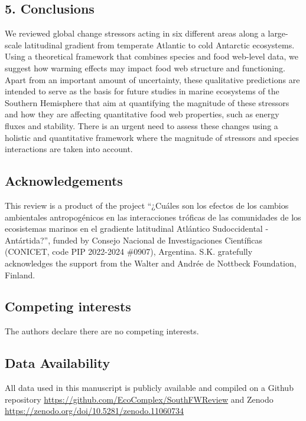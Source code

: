 \documentclass[
]{article}
\begin{document}
\subsection{5. Conclusions}\label{conclusions}

We reviewed global change stressors acting in six different areas along
a large-scale latitudinal gradient from temperate Atlantic to cold
Antarctic ecosystems. Using a theoretical framework that combines
species and food web-level data, we suggest how warming effects may
impact food web structure and functioning. Apart from an important
amount of uncertainty, these qualitative predictions are intended to
serve as the basis for future studies in marine ecosystems of the
Southern Hemisphere that aim at quantifying the magnitude of these
stressors and how they are affecting quantitative food web properties,
such as energy fluxes and stability. There is an urgent need to assess
these changes using a holistic and quantitative framework where the
magnitude of stressors and species interactions are taken into account.

\subsection{Acknowledgements}\label{acknowledgements}

This review is a product of the project ``¿Cuáles son los efectos de los
cambios ambientales antropogénicos en las interacciones tróficas de las
comunidades de los ecosistemas marinos en el gradiente latitudinal
Atlántico Sudoccidental - Antártida?'', funded by Consejo Nacional de
Investigaciones Científicas (CONICET, code PIP 2022-2024 \#0907),
Argentina. S.K. gratefully acknowledges the support from the Walter and
Andrée de Nottbeck Foundation, Finland.


\subsection{Competing interests}\label{Competinginterests}

The authors declare there are no competing interests.

\subsection{Data Availability}\label{DataAvailability}

All data used in this manuscript is publicly available and compiled on a
Github repository \url{https://github.com/EcoComplex/SouthFWReview} and
Zenodo \url{https://zenodo.org/doi/10.5281/zenodo.11060734}
\end{document}
